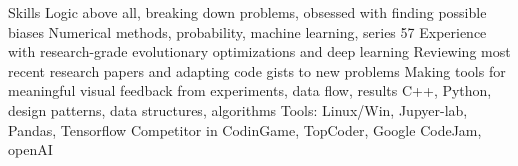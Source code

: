 \begin{rubric}{Skills}
\entry*[]%
Logic above all, breaking down problems, obsessed with finding possible biases 
\entry*[]%
Numerical methods, probability, machine learning, series 57%
\entry*[]%
Experience with research-grade evolutionary optimizations and deep learning 
\entry*[]%
Reviewing most recent research papers and adapting code gists to new problems
\entry*[]%
Making tools for meaningful visual feedback from experiments, data flow, results
%
%
\entry*[]%
C++, Python, design patterns, data structures, algorithms
\entry*[]%
Tools: Linux/Win, Jupyer-lab, Pandas, Tensorflow
\entry*[]%
Competitor in CodinGame, TopCoder, Google CodeJam, openAI 
%
%
%
%
\end{rubric}
